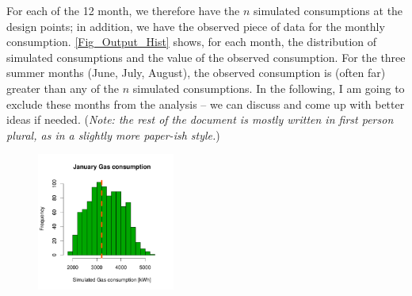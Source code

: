 \documentclass[a4paper, 12pt]{article}
\begin{document}
For each of the 12 month, we therefore have the $n$ simulated consumptions at the design points; in addition, we have the observed piece of data for the monthly consumption.
\autoref{Fig_Output_Hist} shows, for each month, the distribution of simulated consumptions and the value of the observed consumption.
For the three summer months (June, July, August), the observed consumption is (often far) greater than any of the $n$ simulated consumptions. In the following, I am going to exclude these months from the analysis -- we can discuss and come up with better ideas if needed. ({\small \it Note: the rest of the document is mostly written in first person plural, as in a slightly more paper-ish style.})

\newcommand{\scale}{12.2em}
\begin{figure}
\centering
 \includegraphics[width=\scale]{Simulation_histograms/Batch_2_Only/January_Gas}

\end{figure}
\end{document}
